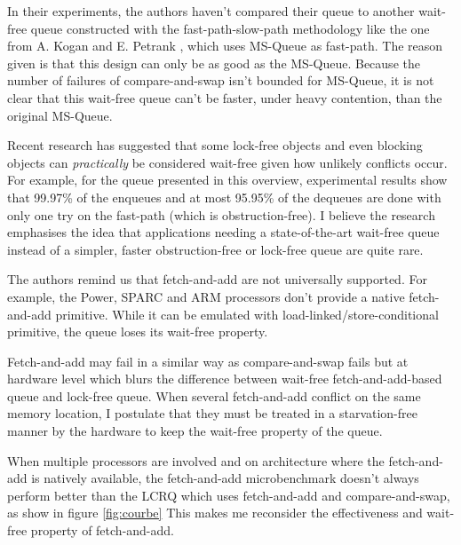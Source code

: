 In their experiments, the authors haven't compared their queue to another
wait-free queue constructed with the fast-path-slow-path methodology like the
one from A. Kogan and E. Petrank \cite{Kogan:2012:MCF:2370036.2145835}, which
uses MS-Queue as fast-path. The reason given is that this design can only be as
good as the MS-Queue. Because the number of failures of compare-and-swap isn't
bounded for MS-Queue, it is not clear that this wait-free queue can't be faster,
under heavy contention, than the original MS-Queue.

Recent research has suggested that some lock-free objects
\cite{Alistarh:2016:LCA:2997039.2903136} and even blocking objects
\cite{David:2016:CSD:2935764.2935774} can \textit{practically} be considered
wait-free given how unlikely conflicts occur. For example, for the queue
presented in this overview, experimental results show that 99.97\% of the
enqueues and at most 95.95\% of the dequeues are done with only one try on the
fast-path (which is obstruction-free). I believe the research emphasises the
idea that applications needing a state-of-the-art wait-free queue instead of a
simpler, faster obstruction-free or lock-free queue are quite rare.

The authors remind us that fetch-and-add are not universally supported. For
example, the Power, SPARC and ARM processors don't provide a native
fetch-and-add primitive. While it can be emulated with
load-linked/store-conditional primitive, the queue loses its wait-free property.

Fetch-and-add may fail in a similar way as compare-and-swap fails but at
hardware level which blurs the difference between wait-free fetch-and-add-based
queue and lock-free queue. When several fetch-and-add conflict on the same
memory location, I postulate that they must be treated in a starvation-free
manner by the hardware to keep the wait-free property of the queue.

When multiple processors are involved and on architecture where the
fetch-and-add is natively available, the fetch-and-add microbenchmark doesn't
always perform better than the LCRQ which uses fetch-and-add and
compare-and-swap, as show in figure \ref{fig:courbe} This makes me reconsider
the effectiveness and wait-free property of fetch-and-add.
